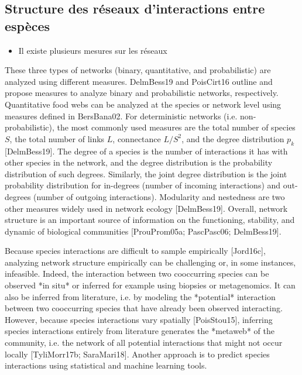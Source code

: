 \subsection{Structure des réseaux d'interactions entre espèces} 

\begin{itemize}
    \item Il existe plusieurs mesures sur les réseaux 
\end{itemize}

These three types of networks (binary, quantitative, and probabilistic) are
analyzed using different measures. DelmBess19 and PoisCirt16 outline and
propose measures to analyze binary and probabilistic networks, respectively.
Quantitative food webs can be analyzed at the species or network level using
measures defined in BersBana02. For deterministic networks (i.e.
non-probabilistic), the most commonly used measures are the total number of
species $S$, the total number of links $L$, connectance $L/S^2$, and the degree
distribution $p_k$ [DelmBess19]. The degree of a species is the number of
interactions it has with other species in the network, and the degree
distribution is the probability distribution of such degrees. Similarly, the
joint degree distribution is the joint probability distribution for in-degrees
(number of incoming interactions) and out-degrees (number of outgoing
interactions). Modularity and nestedness are two other measures widely used in
network ecology [DelmBess19]. Overall, network structure is an important source
of information on the functioning, stability, and dynamic of biological
communities [ProuProm05a; PascPasc06; DelmBess19].

Because species interactions are difficult to sample empirically [Jord16c],
analyzing network structure empirically can be challenging or, in some
instances, infeasible. Indeed, the interaction between two cooccurring species
can be observed *in situ* or inferred for example using biopsies or
metagenomics. It can also be inferred from literature, i.e. by modeling the
*potential* interaction between two cooccurring species that have already been
observed interacting. However, because species interactions vary spatially
[PoisStou15], inferring species interactions entirely from literature generates
the *metaweb* of the community, i.e. the network of all potential interactions
that might not occur locally [TyliMorr17b; SaraMari18]. Another approach is to
predict species interactions using statistical and machine learning tools.

